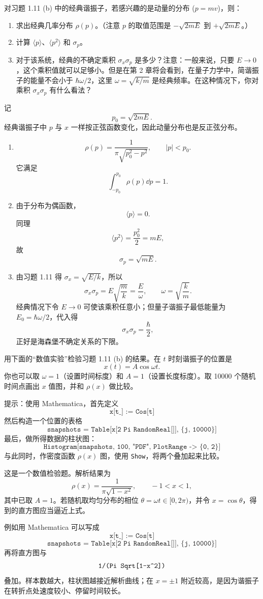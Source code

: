\begin{question}
对习题 1.11 (b) 中的经典谐振子，若感兴趣的是动量的分布 ($p=mv$)，则：
\begin{enumerate}
\item 求出经典几率分布 $\rho(p)$。（注意 $p$ 的取值范围是 $-\sqrt{2mE}$ 到 $+\sqrt{2mE}$。）
\item 计算 $\langle p\rangle$、$\langle p^2\rangle$ 和 $\sigma_p$。
\item 对于该系统，经典的不确定乘积 $\sigma_x\sigma_p$ 是多少？注意：一般来说，只要 $E\to0$，这个乘积值就可以足够小。但是在第 2 章将会看到，在量子力学中，简谐振子的能量不会小于 $\hbar\omega/2$，这里 $\omega=\sqrt{k/m}$ 是经典频率。在这种情况下，你对乘积 $\sigma_x\sigma_p$ 有什么看法？
\end{enumerate}
\end{question}
\begin{solution}
记
\[
p_0=\sqrt{2mE}.
\]
经典谐振子中 $p$ 与 $x$ 一样按正弦函数变化，因此动量分布也是反正弦分布。
\begin{enumerate}
\item
\[
\rho(p)=\frac{1}{\pi\sqrt{p_0^2-p^2}},\qquad |p|<p_0.
\]
它满足
\[
\int_{-p_0}^{p_0}\rho(p)\dd p=1.
\]
\item 由于分布为偶函数，
\[
\langle p\rangle=0.
\]
同理
\[
\langle p^2\rangle=\frac{p_0^2}{2}=mE,
\]
故
\[
\sigma_p=\sqrt{mE}.
\]
\item 由习题 1.11 得 $\sigma_x=\sqrt{E/k}$，所以
\[
\sigma_x\sigma_p=E\sqrt{\frac{m}{k}}=\frac{E}{\omega},
\qquad \omega=\sqrt{\frac{k}{m}}.
\]
经典情况下令 $E\to0$ 可使该乘积任意小；但量子谐振子最低能量为 $E_0=\hbar\omega/2$，代入得
\[
\sigma_x\sigma_p=\frac{\hbar}{2},
\]
正好是海森堡不确定关系的下限。
\end{enumerate}
\end{solution}

\begin{question}
用下面的“数值实验”检验习题 1.11 (b) 的结果。在 $t$ 时刻谐振子的位置是
\[
x(t)=A\cos\omega t.
\tag{1.44}
\]
你也可以取 $\omega=1$（设置时间标度）和 $A=1$（设置长度标度）。取 10000 个随机时间点画出 $x$ 值图，并和 $\rho(x)$ 做比较。

提示：使用 Mathematica，首先定义
\[
\texttt{x[t\_] := Cos[t]}
\]
然后构造一个位置的表格
\[
\texttt{snapshots = Table[x[2 Pi RandomReal[]], \{j, 10000\}]}
\]
最后，做所得数据的柱状图：
\[
\texttt{Histogram[snapshots, 100, "PDF", PlotRange -> \{0, 2\}]}
\]
与此同时，作密度函数 $\rho(x)$ 图，使用 \texttt{Show}，将两个叠加起来比较。
\end{question}
\begin{solution}
这是一个数值检验题。解析结果为
\[
\rho(x)=\frac{1}{\pi\sqrt{1-x^2}},\qquad -1<x<1,
\]
其中已取 $A=1$。若随机取均匀分布的相位 $\theta=\omega t\in[0,2\pi)$，并令 $x=\cos\theta$，得到的直方图应当逼近上式。

例如用 Mathematica 可以写成
\[
\texttt{x[t\_] := Cos[t]}
\]
\[
\texttt{snapshots = Table[x[2 Pi RandomReal[]], \{j, 10000\}]}
\]
再将直方图与
\[
\texttt{1/(Pi Sqrt[1-x\string^2])}
\]
叠加。样本数越大，柱状图越接近解析曲线；在 $x=\pm1$ 附近较高，是因为谐振子在转折点处速度较小、停留时间较长。
\end{solution}

